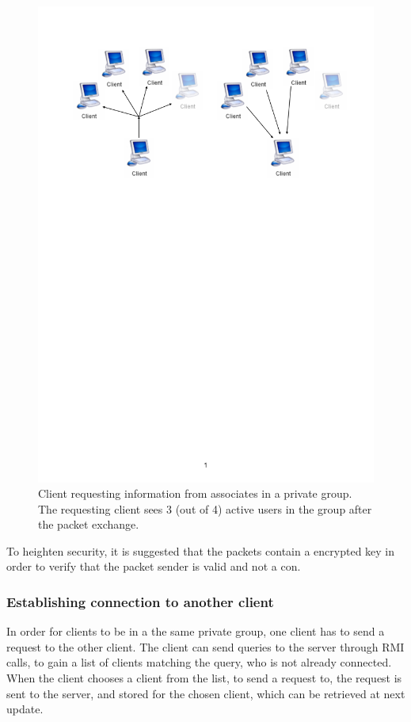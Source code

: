 \begin{figure}[H]
    \centering
    \includegraphics[width=0.9\linewidth]{images/Multicast_client-to-client.pdf}
    \caption{Client requesting information from associates in a private group. The requesting client sees 3 (out of 4) active users in the group after the packet exchange.}
    \label{fig:privateGroupMulticast}
\end{figure}

To heighten security, it is suggested that the packets contain a encrypted key in order to verify that the packet sender is valid and not a con.

\subsubsection{Establishing connection to another client}

In order for clients to be in a the same private group, one client has to send a request to the other client. The client can send queries to the server through RMI calls, to gain a list of clients matching the query, who is not already connected. When the client chooses a client from the list, to send a request to, the request is sent to the server, and stored for the chosen client, which can be retrieved at next update. 

